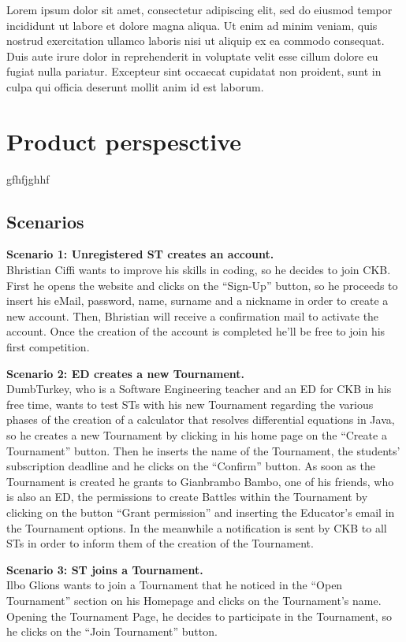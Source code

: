 Lorem ipsum dolor sit amet, consectetur adipiscing elit, sed do eiusmod tempor incididunt ut labore et dolore magna aliqua. Ut enim ad minim veniam, quis nostrud exercitation ullamco laboris nisi ut aliquip ex ea commodo consequat. Duis aute irure dolor in reprehenderit in voluptate velit esse cillum dolore eu fugiat nulla pariatur. Excepteur sint occaecat cupidatat non proident, sunt in culpa qui officia deserunt mollit anim id est laborum.

\newpage

\section{Product perspesctive}
\label{sec:product_perspesctive}%
gfhfjghhf

\subsection{Scenarios}
\label{subsec:scenarios}%
\textbf{Scenario 1: Unregistered ST creates an account.}\\
Bhristian Ciffi wants to improve his skills in coding, so he decides to join CKB. First he opens the website and clicks on the “Sign-Up” button, so he proceeds to insert his eMail, password, name, surname and a nickname in order to create a new account. Then, Bhristian will receive a confirmation mail to activate the account. Once the creation of the account is completed he’ll be free to join his first competition.

\textbf{Scenario 2: ED creates a new Tournament.}\\
DumbTurkey, who is a Software Engineering teacher and an ED for CKB in his free time, wants to test STs with his new Tournament regarding the various phases of the creation of a calculator that resolves differential equations in Java, so he creates a new Tournament by clicking in his home page on the “Create a Tournament” button. Then he inserts the name of the Tournament, the students’ subscription deadline and he clicks on the “Confirm” button. As soon as the Tournament is created he grants to Gianbrambo Bambo, one of his friends, who is also an ED, the permissions to create Battles within the Tournament by clicking on the button “Grant permission” and inserting the Educator’s email in the Tournament options. In the meanwhile a notification is sent by CKB to all STs in order to inform them of the creation of the Tournament.

\textbf{Scenario 3: ST joins a Tournament.}\\
Ilbo Glions wants to join a Tournament that he noticed in the “Open Tournament” section on his Homepage and clicks on the Tournament’s name. Opening the Tournament Page, he decides to participate in the Tournament, so he clicks on the “Join Tournament” button. 

